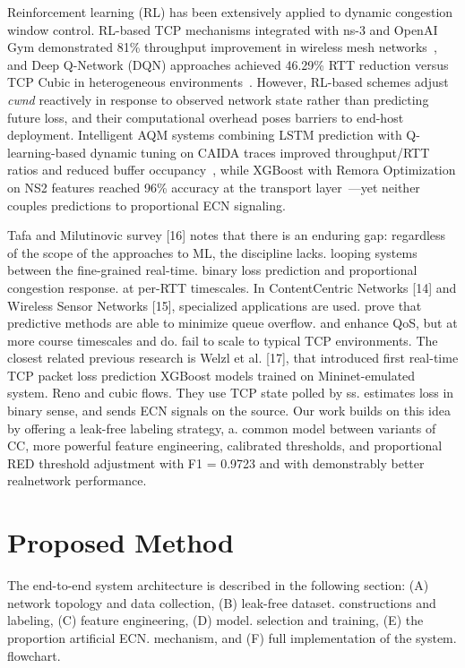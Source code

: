 \documentclass[journal]{IEEEtran}
\begin{document}
Reinforcement learning (RL) has been extensively applied to dynamic congestion window control. RL-based TCP mechanisms integrated with ns-3 and OpenAI Gym demonstrated 81\% throughput improvement in wireless mesh networks~\cite{rl_mesh}, and Deep Q-Network (DQN) approaches achieved 46.29\% RTT reduction versus TCP Cubic in heterogeneous environments~\cite{dqn_tcp}. However, RL-based schemes adjust \emph{cwnd} reactively in response to observed network state rather than predicting future loss, and their computational overhead poses barriers to end-host deployment. Intelligent AQM systems combining LSTM prediction with Q-learning-based dynamic tuning on CAIDA traces improved throughput/RTT ratios and reduced buffer occupancy~\cite{aqm_lstm}, while XGBoost with Remora Optimization on NS2 features reached 96\% accuracy at the transport layer~\cite{remora}---yet neither couples predictions to proportional ECN signaling.

Tafa and Milutinovic survey [16] notes that there is an enduring gap: regardless of the scope of the approaches to ML, the discipline lacks.
looping systems between the fine-grained real-time.
binary loss prediction and proportional congestion response.
at per-RTT timescales. In ContentCentric Networks [14] and Wireless Sensor Networks [15], specialized applications are used.
prove that predictive methods are able to minimize queue overflow.
and enhance QoS, but at more course timescales and do.
fail to scale to typical TCP environments.
The closest related previous research is Welzl et al. [17],
that introduced first real-time TCP packet loss prediction
XGBoost models trained on Mininet-emulated system.
Reno and cubic flows. They use TCP state polled by ss.
estimates loss in binary sense, and sends ECN signals on the source. Our
work builds on this idea by offering a leak-free labeling strategy, a.
common model between variants of CC, more powerful feature engineering,
calibrated thresholds, and proportional RED threshold adjustment with F1 = 0.9723 and with demonstrably better realnetwork performance.

\section{Proposed Method}
\label{sec:method}

The end-to-end system architecture is described in the following section:
(A) network topology and data collection, (B) leak-free dataset.
constructions and labeling, (C) feature engineering, (D) model.
selection and training, (E) the proportion artificial ECN.
mechanism, and (F) full implementation of the system.
flowchart.
\end{document}
